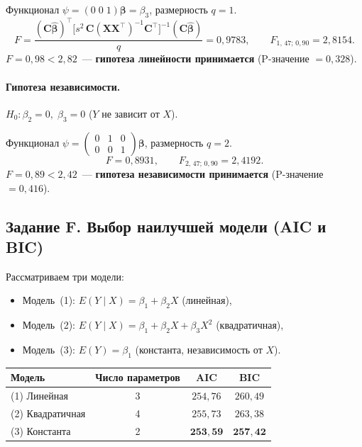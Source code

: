 \documentclass[12pt,a4paper]{article}
\begin{document}
Функционал $\psi = (0\; 0\; 1)\boldsymbol{\beta} = \beta_3$, размерность $q = 1$.
\[
F = \frac{(\mathbf{C}\hat{\boldsymbol{\beta}})^\top\bigl[s^2\,\mathbf{C}(\mathbf{X}\mathbf{X}^\top)^{-1}\mathbf{C}^\top\bigr]^{-1}(\mathbf{C}\hat{\boldsymbol{\beta}})}{q}
  = 0{,}9783, \qquad F_{1,\,47;\,0{,}90} = 2{,}8154.
\]
$F = 0{,}98 < 2{,}82$~--- \textbf{гипотеза линейности принимается} (P-значение $= 0{,}328$).

\paragraph{Гипотеза независимости.} $H_0: \beta_2 = 0,\; \beta_3 = 0$ ($Y$ не зависит от $X$).

Функционал $\psi = \begin{pmatrix}0&1&0\\0&0&1\end{pmatrix}\boldsymbol{\beta}$, размерность $q = 2$.
\[
F = 0{,}8931, \qquad F_{2,\,47;\,0{,}90} = 2{,}4192.
\]
$F = 0{,}89 < 2{,}42$~--- \textbf{гипотеза независимости принимается} (P-значение $= 0{,}416$).

\subsection{Задание F. Выбор наилучшей модели (AIC и BIC)}

Рассматриваем три модели:
\begin{itemize}
  \item Модель~(1): $E(Y\mid X) = \beta_1 + \beta_2 X$ (линейная),
  \item Модель~(2): $E(Y\mid X) = \beta_1 + \beta_2 X + \beta_3 X^2$ (квадратичная),
  \item Модель~(3): $E(Y) = \beta_1$ (константа, независимость от $X$).
\end{itemize}

\begin{center}
\begin{tabular}{lccc}
\toprule
Модель & Число параметров & AIC & BIC \\
\midrule
(1) Линейная     & 3 & $254{,}76$ & $260{,}49$ \\
(2) Квадратичная & 4 & $255{,}73$ & $263{,}38$ \\
(3) Константа    & 2 & $\mathbf{253{,}59}$ & $\mathbf{257{,}42}$ \\
\bottomrule
\end{tabular}
\end{center}
\end{document}

